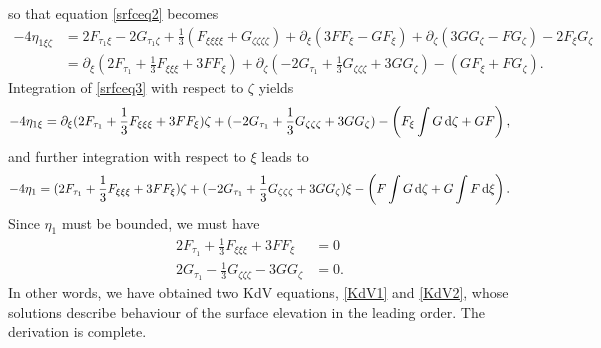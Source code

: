 \documentclass[10pt,reqno,oneside,a4paper]{article}
\begin{document}
so that equation \eqref{srfceq2} becomes
\begin{align}
- 4\eta_{1\xi \zeta} &= 2F_{\tau_1 \xi} - 2G_{\tau_1 \zeta} + \frac{1}{3}(F_{\xi\xi\xi\xi} + G_{\zeta\zeta\zeta\zeta}) + \partial_\xi(3 F F_\xi - G F_\xi) + \partial_\zeta(3 G G_\zeta - F G_\zeta) - 2 F_\xi G_\zeta \nonumber \\
&= \partial_\xi(2F_{\tau_1} + \frac{1}{3}F_{\xi\xi\xi} + 3 F F_\xi) + \partial_\zeta(- 2G_{\tau_1} +  \frac{1}{3}G_{\zeta\zeta\zeta} + 3 G G_\zeta) - (G F_\xi  + F G_\zeta). \label{srfceq3}
\end{align}
Integration of \eqref{srfceq3} with respect to $\zeta$ yields
\[ 
- 4\eta_{1\xi} = \partial_\xi(2F_{\tau_1} + \frac{1}{3}F_{\xi\xi\xi} + 3 F F_\xi) \zeta + (- 2G_{\tau_1} +  \frac{1}{3}G_{\zeta\zeta\zeta} + 3 G G_\zeta) - \left(F_\xi \int G \,\mathrm{d} \zeta   + G F\right),
\]
and further integration with respect to $\xi$ leads to
\[ 
- 4\eta_{1} = (2F_{\tau_1} + \frac{1}{3}F_{\xi\xi\xi} + 3 F F_\xi) \zeta + (- 2G_{\tau_1} +  \frac{1}{3}G_{\zeta\zeta\zeta}+ 3 G G_\zeta) \xi - \left(F \int G \,\mathrm{d} \zeta  + G \int F \,\mathrm{d} \xi \right).
\]
Since $\eta_1$ must be bounded, we must have 
\begin{align}
2F_{\tau_1} + \frac{1}{3}F_{\xi\xi\xi} + 3 F F_\xi &= 0 \label{KdV1} \\
2G_{\tau_1} - \frac{1}{3}G_{\zeta\zeta\zeta} -  3 G G_\zeta &= 0. \label{KdV2}
\end{align}
In other words, we have obtained two KdV equations, \eqref{KdV1} and \eqref{KdV2}, whose solutions describe behaviour of the surface elevation in the leading order. The derivation is complete.
\end{document}
